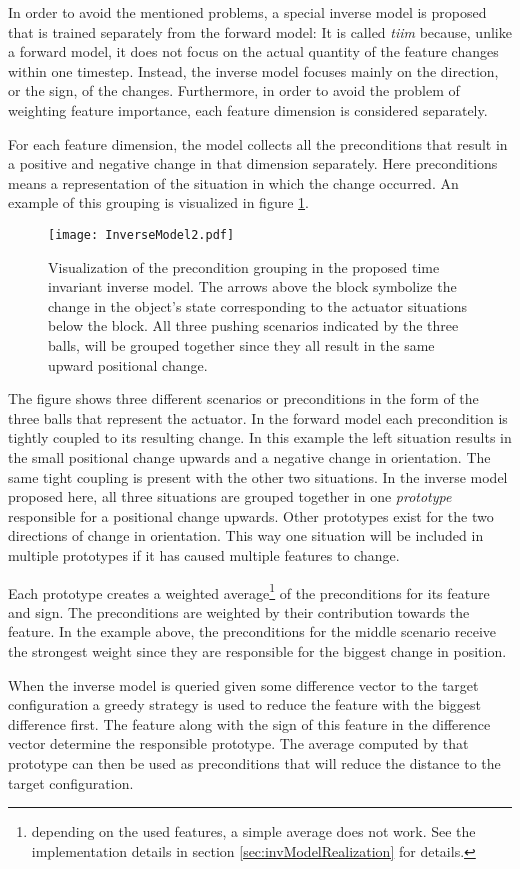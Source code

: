 In order to avoid the mentioned problems, a special inverse model is proposed that is trained separately from the forward model:
It is called \textit{\gls{tiim}} because, unlike a forward model, it does not focus on the actual quantity of the feature changes within one timestep. Instead, the inverse model focuses mainly on the direction, or the sign, of the changes. Furthermore, in order to avoid the problem of weighting feature importance, each feature dimension is considered separately. 

For each feature dimension, the model collects all the preconditions that result in a positive and negative change in that dimension separately. Here preconditions means a representation of the situation in which the change occurred.  
An example of this grouping is visualized in figure \ref{fig:InverseModel}. 

\begin{figure}
	\centering
	\texttt{[image: InverseModel2.pdf]}
	\caption{Visualization of the precondition grouping in the proposed time invariant inverse model. The arrows above the block symbolize the change in the object's state corresponding to the actuator situations below the block. All three pushing scenarios indicated by the three balls, will be grouped together since they all result in the same upward positional change.}
	\label{fig:InverseModel}
\end{figure}

The figure shows three different scenarios or preconditions in the form of the three balls that represent the actuator. In the forward model each precondition is tightly coupled to its resulting change. In this example the left situation results in the small positional change upwards and a negative change in orientation. The same tight coupling is present with the other two situations. In the inverse model proposed here, all three situations are grouped together in one \textit{prototype} responsible for a positional change upwards. Other prototypes exist for the two directions of change in orientation. This way one situation will be included in multiple prototypes if it has caused multiple features to change.

Each prototype creates a weighted average\footnote{depending on the used features, a simple average does not work. See the implementation details in section \ref{sec:invModelRealization} for details.} of the preconditions for its feature and sign. The preconditions are weighted by their contribution towards the feature. In the example above, the preconditions for the middle scenario receive the strongest weight since they are responsible for the biggest change in position. 

When the inverse model is queried given some difference vector to the target configuration a greedy strategy is used to reduce the feature with the biggest difference first. 
The feature along with the sign of this feature in the difference vector determine the responsible prototype. The average computed by that prototype can then be used as preconditions that will reduce the distance to the target configuration.



	
